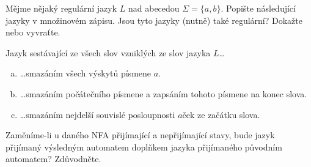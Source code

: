 \documentclass[a4paper,12pt]{amsart}
\begin{document}
\medskip\begin{problem}[Mazání]

    Mějme nějaký regulární jazyk $L$ nad abecedou $\Sigma=\{a,b\}$. Popište následující jazyky v množinovém zápisu. Jsou tyto jazyky (nutně) také regulární? Dokažte nebo vyvraťte. 
    
    \medskip

    Jazyk sestávající ze všech slov vzniklých ze slov jazyka $L$\dots
    
    \medskip
    \begin{enumerate}[(a)]\setlength\itemsep{12pt}
            \item \dots smazáním všech výskytů písmene $a$.
            \item \dots smazáním počátečního písmene a zapsáním tohoto písmene na konec slova.
            \item \dots smazáním nejdelší souvislé posloupnosti $a$ček ze začátku slova.
    \end{enumerate}

\end{problem}

    
\medskip\begin{problem}
        
    Zaměníme-li u daného NFA přijímající a nepřijímající stavy, bude jazyk přijímaný výsledným automatem doplňkem jazyka přijímaného původním automatem? Zdůvodněte.
        
\end{problem}
\end{document}
